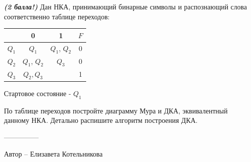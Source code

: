 \question
\textbf{\textit{(2 балла!)}} Дан НКА, принимающий бинарные символы и распознающий слова соответственно таблице переходов:

\begin{tabular}{||c | c c c||} 
 \hline
 & 0 & 1 & $F$ \\ 
 \hline\hline
 $Q_1$ & $Q_1$ & $Q_1$, $Q_2$& 0 \\ 
 \hline
 $Q_2$ &  $Q_1$, $Q_2$& $Q_3$ & 0 \\
 \hline
 $Q_3$ & $Q_2, Q_3$&  & 1 \\
 \hline
\end{tabular}

Стартовое состояние - $Q_1$

По таблице переходов постройте диаграмму Мура и ДКА, эквивалентный данному НКА. Детально распишите алгоритм построения ДКА.

---------------

Автор -- Елизавета Котельникова
